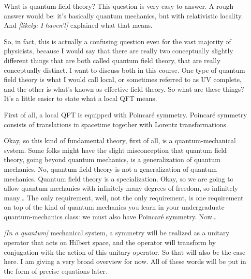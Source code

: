 What is quantum field theory? This question is very easy to answer. A rough
answer would be: it's basically quantum mechanics, but with relativistic
locality. And \emph{[likely: I haven't]} explained what that means.


So, in fact, this is actually a confusing question even for the vast majority
of physicists, because I would say that there are really two conceptually
slightly different things that are both called quantum field theory, that are
really conceptually distinct. I want to discuss both in this course. One type
of quantum field theory is what I would call local, or sometimes referred to
as UV complete, and the other is what's known as effective field theory. So
what are these things? It's a little easier to state what a local QFT means.

First of all, a local QFT is equipped with Poincar\'e symmetry. Poincar\'e
symmetry consists of translations in spacetime together with Lorentz
transformations.


Okay, so this kind of fundamental theory, first of all, is a quantum-mechanical
system. Some folks might have the slight misconception that quantum field
theory, going beyond quantum mechanics, is a generalization of quantum
mechanics. No, quantum field theory is not a generalization of quantum
mechanics. Quantum field theory is a specialization. Okay, so we are going to
allow quantum mechanics with infinitely many degrees of freedom, so infinitely
many\ldots{} The only requirement, well, not the only requirement, is one
requirement on top of the kind of quantum mechanics you learn in your
undergraduate quantum-mechanics class: we must also have Poincar\'e symmetry.
Now\ldots{}

\emph{[In a quantum]} mechanical system, a symmetry will be realized as a
unitary operator that acts on Hilbert space, and the operator will transform by
conjugation with the action of this unitary operator. So that will also be the
case here. I am giving a very broad overview for now. All of these words will
be put in the form of precise equations later.


